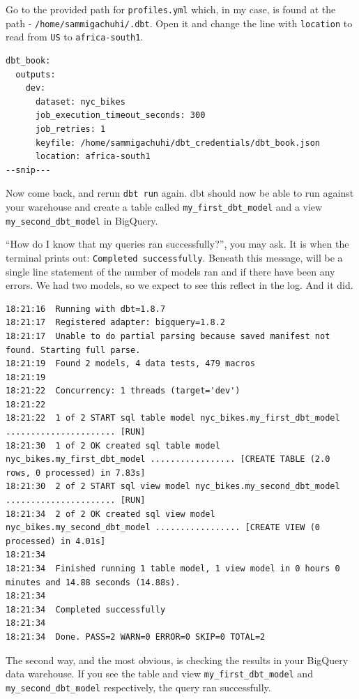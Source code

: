 \documentclass[
]{book}
\begin{document}
Go to the provided path for \texttt{profiles.yml} which, in my case, is found at the path - \texttt{/home/sammigachuhi/.dbt}. Open it and change the line with \texttt{location} to read from \texttt{US} to \texttt{africa-south1}.

\begin{verbatim}
dbt_book:
  outputs:
    dev:
      dataset: nyc_bikes
      job_execution_timeout_seconds: 300
      job_retries: 1
      keyfile: /home/sammigachuhi/dbt_credentials/dbt_book.json
      location: africa-south1 
--snip---
\end{verbatim}

Now come back, and rerun \texttt{dbt\ run} again. dbt should now be able to run against your warehouse and create a table called \texttt{my\_first\_dbt\_model} and a view \texttt{my\_second\_dbt\_model} in BigQuery.

``How do I know that my queries ran successfully?'', you may ask. It is when the terminal prints out: \texttt{Completed\ successfully}. Beneath this message, will be a single line statement of the number of models ran and if there have been any errors. We had two models, so we expect to see this reflect in the log. And it did.

\begin{verbatim}
18:21:16  Running with dbt=1.8.7
18:21:17  Registered adapter: bigquery=1.8.2
18:21:17  Unable to do partial parsing because saved manifest not found. Starting full parse.
18:21:19  Found 2 models, 4 data tests, 479 macros
18:21:19  
18:21:22  Concurrency: 1 threads (target='dev')
18:21:22  
18:21:22  1 of 2 START sql table model nyc_bikes.my_first_dbt_model ...................... [RUN]
18:21:30  1 of 2 OK created sql table model nyc_bikes.my_first_dbt_model ................. [CREATE TABLE (2.0 rows, 0 processed) in 7.83s]
18:21:30  2 of 2 START sql view model nyc_bikes.my_second_dbt_model ...................... [RUN]
18:21:34  2 of 2 OK created sql view model nyc_bikes.my_second_dbt_model ................. [CREATE VIEW (0 processed) in 4.01s]
18:21:34  
18:21:34  Finished running 1 table model, 1 view model in 0 hours 0 minutes and 14.88 seconds (14.88s).
18:21:34  
18:21:34  Completed successfully
18:21:34  
18:21:34  Done. PASS=2 WARN=0 ERROR=0 SKIP=0 TOTAL=2
\end{verbatim}

The second way, and the most obvious, is checking the results in your BigQuery data warehouse. If you see the table and view \texttt{my\_first\_dbt\_model} and \texttt{my\_second\_dbt\_model} respectively, the query ran successfully.
\end{document}
